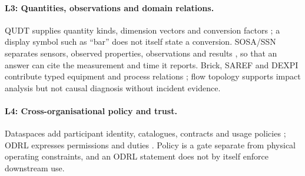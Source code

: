 \paragraph{L3: Quantities, observations and domain relations.} QUDT supplies quantity
kinds, dimension vectors and conversion factors \cite{qudt}; a display symbol such as
``bar'' does not itself state a conversion. SOSA/SSN separates sensors, observed properties,
observations and results \cite{haller2019ssn}, so that an answer can cite the measurement
and time it reports. Brick, SAREF and DEXPI contribute typed equipment and process
relations \cite{balaji2016brick,etsi2020saref,dexpi}; flow topology supports impact
analysis but not causal diagnosis without incident evidence.

\paragraph{L4: Cross-organisational policy and trust.} Dataspaces add participant identity,
catalogues, contracts and usage policies \cite{idsa2022ram,catenax}; ODRL expresses
permissions and duties \cite{w3c2018odrl}. Policy is a gate separate from physical
operating constraints, and an ODRL statement does not by itself enforce downstream use.
